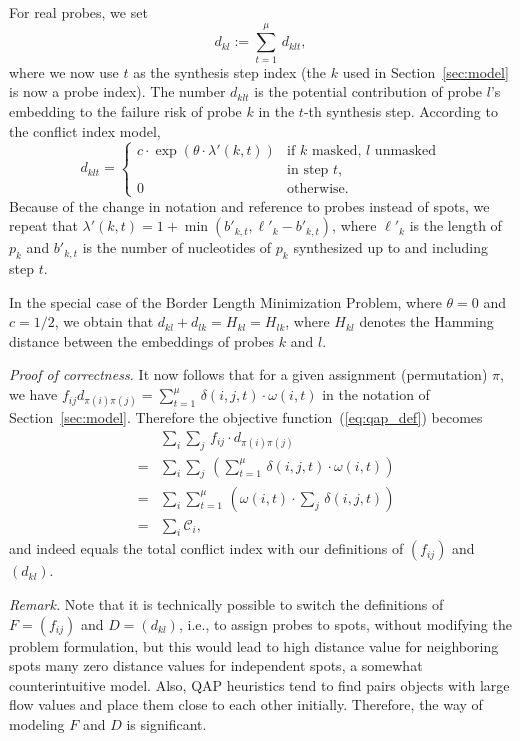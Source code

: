 \documentclass{bioinfo}
\newcommand{\paragraph}[1]{\par\textit{#1}}
\begin{document}
For real probes, we set
\[ d_{kl} := \sum_{t=1}^\mu\, d_{klt}, \]
where we now use $t$ as the synthesis step index (the $k$ used in
Section~\ref{sec:model} is now a probe index). The number $d_{klt}$ is the
potential contribution of probe $l$'s embedding to the failure risk of probe
$k$ in the $t$-th synthesis step. According to the conflict index model,
\[ d_{klt}  = \left\{ \begin{array}{ll}
    c \cdot \exp(\theta \cdot \lambda'(k,t)) 
    & \mbox{if $k$ masked, $l$ unmasked}\\
    & \mbox{in step $t$,}\\
    0
    & \mbox{otherwise.}
  \end{array} \right.
\]
Because of the change in notation and reference to probes instead of spots, we
repeat that $\lambda'(k,t) = 1 + \min(b'_{k,t},\ell'_{k} - b'_{k,t})$, where
$\ell'_{k}$ is the length of $p_k$ and $b'_{k,t}$ is the number of nucleotides
of $p_k$ synthesized up to and including step $t$.

In the special case of the Border Length Minimization Problem, where
$\theta=0$ and $c=1/2$, we obtain that $d_{kl} + d_{lk} = H_{kl} = H_{lk}$,
where $H_{kl}$ denotes the  Hamming distance between the embeddings of probes
$k$ and $l$.


\paragraph{Proof of correctness.}
It now follows that for a given assignment (permutation) $\pi$, we have
$f_{ij} d_{\pi(i)\pi(j)} = \sum_{t=1}^\mu\, \delta(i,j,t) \cdot \omega(i,t)$
in the notation of Section~\ref{sec:model}. Therefore the objective
function~(\ref{eq:qap_def}) becomes
\begin{eqnarray*}
  & & \sum_i \sum_j\, f_{ij} \cdot d_{\pi(i)\pi(j)}\\
  &=& \sum_i \sum_j\, \left( \sum_{t=1}^\mu\, \delta(i,j,t) \cdot \omega(i,t)  \right)\\
  &=& \sum_i \sum_{t=1}^\mu\, \left( \omega(i,t) \cdot \sum_j\, \delta(i,j,t)  \right)\\
  &=& \sum_i \mathcal{C}_i,
\end{eqnarray*}
and indeed equals the total conflict index with our definitions of $(f_{ij})$
and $(d_{kl})$.


\paragraph{Remark.} 
Note that it is technically possible to switch the definitions of $F=(f_{ij})$
and $D=(d_{kl})$, i.e., to assign probes to spots, without modifying the
problem formulation, but this would lead to high distance value for
neighboring spots many zero distance values for independent spots, a somewhat
counterintuitive model. Also, QAP heuristics tend to find pairs objects with
large flow values and place them close to each other initially. Therefore, the
way of modeling $F$ and $D$ is significant.
\end{document}
